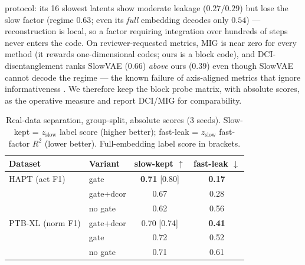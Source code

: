 \documentclass[10pt,twocolumn]{article}
\begin{document}
protocol: its 16 slowest latents show moderate leakage ($0.27/0.29$) but lose
the slow factor (regime $0.63$; even its \emph{full} embedding decodes only
$0.54$) --- reconstruction is local, so a factor requiring integration over
hundreds of steps never enters the code. On reviewer-requested metrics, MIG
\cite{chen2018isolating} is
near zero for every method (it rewards one-dimensional codes; ours is a block
code), and DCI-disentanglement \cite{eastwood2018framework} ranks SlowVAE
($0.66$) \emph{above} ours
($0.39$) even though SlowVAE cannot decode the regime --- the known failure of
axis-aligned metrics that ignore informativeness \cite{locatello2019challenging}. We
therefore keep the block probe matrix, with absolute scores, as the operative
measure and report DCI/MIG for comparability.

\begin{table}[t]
\centering\small
\caption{\small Real-data separation, group-split, absolute scores (3 seeds).
Slow-kept = $z_{\mathrm{slow}}$ label score (higher better); fast-leak =
$z_{\mathrm{slow}}$ fast-factor $R^2$ (lower better). Full-embedding label
score in brackets.}
\begin{tabular}{@{}llcc@{}}
\toprule
Dataset & Variant & slow-kept $\uparrow$ & fast-leak $\downarrow$ \\
\midrule
HAPT (act F1)   & gate      & \textbf{0.71} [0.80] & \textbf{0.17} \\
                & gate+dcor & 0.67 & 0.28 \\
                & no gate   & 0.62 & 0.56 \\
PTB-XL (norm F1) & gate+dcor & 0.70 [0.74] & \textbf{0.41} \\
                 & gate      & 0.72 & 0.52 \\
                 & no gate   & 0.71 & 0.61 \\
\bottomrule
\end{tabular}
\end{table}
\end{document}
